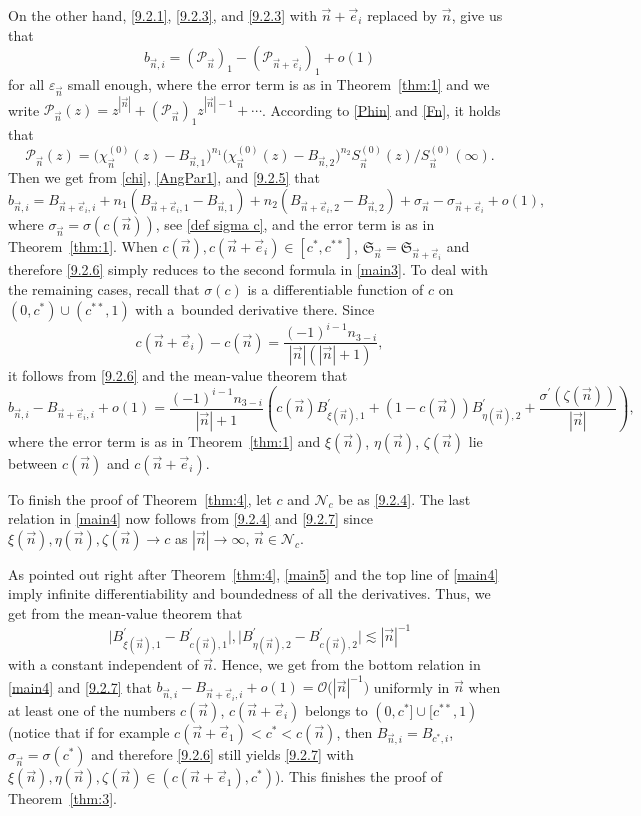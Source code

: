 \documentclass[10pt,a4paper]{amsart}
\numberwithin{equation}{section}
\newcommand{\n}{{\vec n}}
\newcommand{\RS}{\boldsymbol{\mathfrak{S}}}
\begin{document}
On the other hand, \eqref{9.2.1}, \eqref{9.2.3}, and \eqref{9.2.3} with $ \n+\vec e_i $ replaced by $ \n $, give us that
\begin{equation}
\label{9.2.5}
b_{\n,i} = (\mathcal P_\n)_1 - (\mathcal P_{\n+\vec e_i})_1 + o(1)
\end{equation}
for all $ \varepsilon_\n $ small enough, where the error term is as in Theorem~\ref{thm:1} and we write $ \mathcal P_\n(z) = z^{|\n|} + (\mathcal P_\n)_1 z^{|\n|-1} + \cdots $. According to \eqref{Phin} and \eqref{Fn}, it holds that
\[
\mathcal P_\n(z) = \bigl( \chi_\n^{(0)}(z) -B_{\n,1} \bigr)^{n_1} \bigl( \chi_\n^{(0)}(z)-B_{\n,2} \bigr)^{n_2} S_\n^{(0)}(z) / S_\n^{(0)}(\infty).
\]
Then we get from \eqref{chi}, \eqref{AngPar1}, and \eqref{9.2.5} that
\begin{equation}
\label{9.2.6}
b_{\n,i} = B_{\n+\vec e_i,i} + n_1( B_{\n+\vec e_i,1} - B_{\n,1} ) + n_2( B_{\n+\vec e_i,2} - B_{\n,2} ) + \sigma_\n - \sigma_{\n+\vec e_i} + o(1),
\end{equation}
where $ \sigma_\n=\sigma(c(\n))$, see \eqref{def sigma c}, and the error term is as in Theorem~\ref{thm:1}. When $ c(\n),c(\n+\vec e_i)\in[c^*,c^{**}] $, $ \RS_\n=\RS_{\n+\vec e_i} $ and therefore \eqref{9.2.6} simply reduces to the second formula in \eqref{main3}. To deal with the remaining cases, recall that $ \sigma(c) $ is a differentiable function of $ c $ on $ (0,c^*)\cup(c^{**},1) $ with a~bounded derivative there. Since
\[
c(\n+\vec e_i) - c(\n) = \frac{(-1)^{i-1}n_{3-i}}{|\n|(|\n|+1)},
\]
it follows from \eqref{9.2.6} and the mean-value theorem that
\begin{equation}
\label{9.2.7}
b_{\n,i} - B_{\n+\vec e_i,i} + o(1) = \frac{(-1)^{i-1}n_{3-i}}{|\n|+1}\left( c(\n)B^\prime_{\xi(\n),1} + (1-c(\n))B_{\eta(\n),2}^\prime + \frac{\sigma^\prime(\zeta(\n))}{|\n|}\right),
\end{equation}
where the error term is as in Theorem~\ref{thm:1} and $ \xi(\n)$, $\eta(\n)$, $\zeta(\n) $ lie between $ c(\n) $ and $ c(\n+\vec e_i) $.

To finish the proof of Theorem~\ref{thm:4}, let $ c $ and $ \mathcal N_c $ be as \eqref{9.2.4}. The last relation in \eqref{main4} now follows from \eqref{9.2.4} and \eqref{9.2.7} since $ \xi(\n),\eta(\n),\zeta(\n) \to c $ as $ |\n|\to\infty $, $ \n\in\mathcal N_c $.

As pointed out right after Theorem~\ref{thm:4}, \eqref{main5} and the top line of \eqref{main4} imply infinite differentiability and boundedness of all the derivatives. Thus, we get from the mean-value theorem that
\[
\big| B^\prime_{\xi(\n),1} - B^\prime_{c(\n),1} \big|,\big| B^\prime_{\eta(\n),2} - B^\prime_{c(\n),2} \big| \lesssim |\n|^{-1}
\]
with a constant independent of $ \n $. Hence, we get from the bottom relation in \eqref{main4} and \eqref{9.2.7} that
$
b_{\n,i} - B_{\n+\vec e_i,i} + o(1) = \mathcal O\bigl(|\n|^{-1}\bigr)
$
uniformly in $ \n $ when at least one of the numbers $ c(\n)$, $c(\n+\vec e_i) $ belongs to $ (0,c^*] \cup [c^{**},1) $ (notice that if for example $ c(\n+\vec e_1)<c^*<c(\n) $, then $ B_{\n,i}=B_{c^*,i} $, $ \sigma_\n=\sigma(c^*) $ and therefore \eqref{9.2.6} still yields \eqref{9.2.7} with $ \xi(\n),\eta(\n),\zeta(\n) \in (c(\n+\vec e_1),c^*) $). This finishes the proof of Theorem~\ref{thm:3}.
\end{document}

